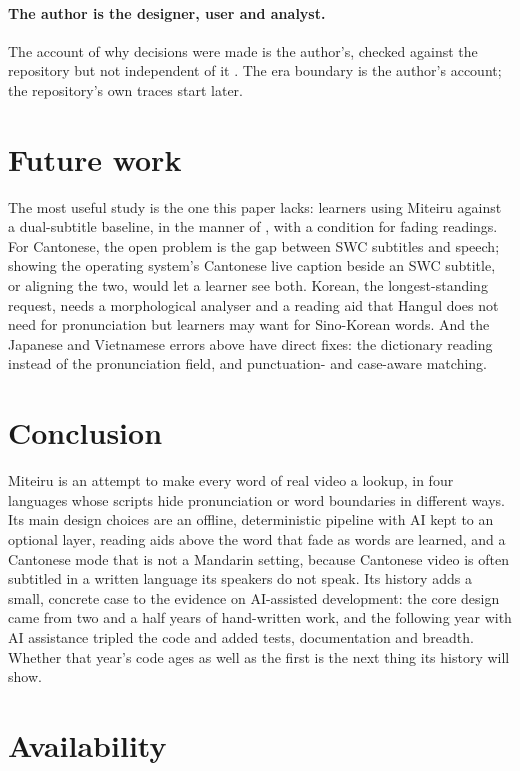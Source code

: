 ﻿\documentclass[11pt,a4paper]{article}
\begin{document}
\paragraph{The author is the designer, user and analyst.}
The account of why decisions were made is the author's, checked against the repository but not independent of it \citep{desjardins2018revealing}. The era boundary is the author's account; the repository's own traces start later.

\section{Future work}
\label{sec:future}

The most useful study is the one this paper lacks: learners using Miteiru against a dual-subtitle baseline, in the manner of \citet{kovacs2014smart}, with a condition for fading readings. For Cantonese, the open problem is the gap between SWC subtitles and speech; showing the operating system's Cantonese live caption beside an SWC subtitle, or aligning the two, would let a learner see both. Korean, the longest-standing request, needs a morphological analyser and a reading aid that Hangul does not need for pronunciation but learners may want for Sino-Korean words. And the Japanese and Vietnamese errors above have direct fixes: the dictionary reading instead of the pronunciation field, and punctuation- and case-aware matching.

\section{Conclusion}
\label{sec:conclusion}

Miteiru is an attempt to make every word of real video a lookup, in four languages whose scripts hide pronunciation or word boundaries in different ways. Its main design choices are an offline, deterministic pipeline with AI kept to an optional layer, reading aids above the word that fade as words are learned, and a Cantonese mode that is not a Mandarin setting, because Cantonese video is often subtitled in a written language its speakers do not speak. Its history adds a small, concrete case to the evidence on AI-assisted development: the core design came from two and a half years of hand-written work, and the following year with AI assistance tripled the code and added tests, documentation and breadth. Whether that year's code ages as well as the first is the next thing its history will show.

\section{Availability}
\label{sec:availability}
\end{document}
